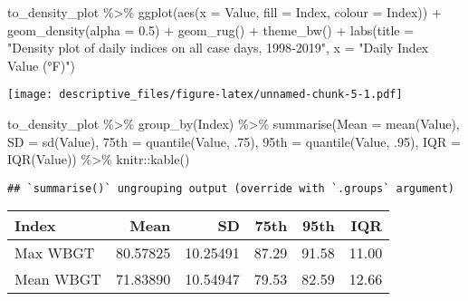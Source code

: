 \documentclass[
]{article}
\newenvironment{Shaded}{\begin{snugshade}}{\end{snugshade}}
\newcommand{\AttributeTok}[1]{\textcolor[rgb]{0.77,0.63,0.00}{#1}}
\newcommand{\DecValTok}[1]{\textcolor[rgb]{0.00,0.00,0.81}{#1}}
\newcommand{\FloatTok}[1]{\textcolor[rgb]{0.00,0.00,0.81}{#1}}
\newcommand{\FunctionTok}[1]{\textcolor[rgb]{0.00,0.00,0.00}{#1}}
\newcommand{\NormalTok}[1]{#1}
\newcommand{\OtherTok}[1]{\textcolor[rgb]{0.56,0.35,0.01}{#1}}
\newcommand{\SpecialCharTok}[1]{\textcolor[rgb]{0.00,0.00,0.00}{#1}}
\newcommand{\StringTok}[1]{\textcolor[rgb]{0.31,0.60,0.02}{#1}}
\begin{document}
\begin{Shaded}
\begin{Highlighting}[]
\NormalTok{to\_density\_plot }\SpecialCharTok{\%\textgreater{}\%}   
  \FunctionTok{ggplot}\NormalTok{(}\FunctionTok{aes}\NormalTok{(}\AttributeTok{x =}\NormalTok{ Value, }\AttributeTok{fill =}\NormalTok{ Index, }\AttributeTok{colour =}\NormalTok{ Index)) }\SpecialCharTok{+}
      \FunctionTok{geom\_density}\NormalTok{(}\AttributeTok{alpha =} \FloatTok{0.5}\NormalTok{) }\SpecialCharTok{+}
      \FunctionTok{geom\_rug}\NormalTok{() }\SpecialCharTok{+}
      \FunctionTok{theme\_bw}\NormalTok{() }\SpecialCharTok{+}
  \FunctionTok{labs}\NormalTok{(}\AttributeTok{title =} \StringTok{"Density plot of daily indices on all case days, 1998{-}2019"}\NormalTok{,}
       \AttributeTok{x =} \StringTok{"Daily Index Value (°F)"}\NormalTok{)}
\end{Highlighting}
\end{Shaded}

\texttt{[image: descriptive\_files/figure-latex/unnamed-chunk-5-1.pdf]}

\begin{Shaded}
\begin{Highlighting}[]
\NormalTok{to\_density\_plot }\SpecialCharTok{\%\textgreater{}\%} 
  \FunctionTok{group\_by}\NormalTok{(Index) }\SpecialCharTok{\%\textgreater{}\%} 
  \FunctionTok{summarise}\NormalTok{(}\AttributeTok{Mean =} \FunctionTok{mean}\NormalTok{(Value),}
            \AttributeTok{SD =} \FunctionTok{sd}\NormalTok{(Value),}
            \StringTok{\textasciigrave{}}\AttributeTok{75th}\StringTok{\textasciigrave{}} \OtherTok{=} \FunctionTok{quantile}\NormalTok{(Value, .}\DecValTok{75}\NormalTok{),}
            \StringTok{\textasciigrave{}}\AttributeTok{95th}\StringTok{\textasciigrave{}} \OtherTok{=} \FunctionTok{quantile}\NormalTok{(Value, .}\DecValTok{95}\NormalTok{),}
            \AttributeTok{IQR =} \FunctionTok{IQR}\NormalTok{(Value)) }\SpecialCharTok{\%\textgreater{}\%} 
\NormalTok{  knitr}\SpecialCharTok{::}\FunctionTok{kable}\NormalTok{()}
\end{Highlighting}
\end{Shaded}

\begin{verbatim}
## `summarise()` ungrouping output (override with `.groups` argument)
\end{verbatim}

\begin{longtable}[]{@{}lrrrrr@{}}
\toprule
Index & Mean & SD & 75th & 95th & IQR\tabularnewline
\midrule
\endhead
Max WBGT & 80.57825 & 10.25491 & 87.29 & 91.58 & 11.00\tabularnewline
Mean WBGT & 71.83890 & 10.54947 & 79.53 & 82.59 & 12.66\tabularnewline
\bottomrule
\end{longtable}
\end{document}
